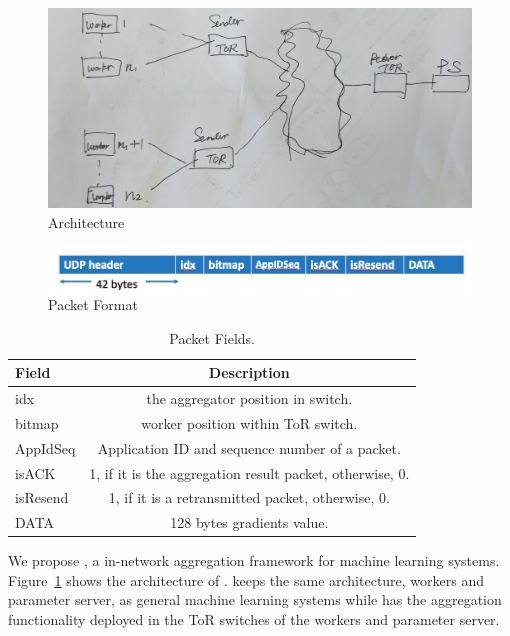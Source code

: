 \begin{figure}[htb]
    \centering
    \includegraphics[width=1.0\linewidth]{figures/p4ml-arch.jpg}
    \caption{\system Architecture}
    \label{fig:p4ml-arch}
\end{figure}
\begin{figure}
    \centering
    \includegraphics[width=1.0\linewidth]{figures/pktformat.jpeg}
    \caption{\system Packet Format}
    \label{fig:packet-format}
\end{figure}
\begin{table}[h!]
  \begin{center}
    \caption{Packet Fields.}
    \label{tab:packet-field}
    \begin{tabular}{|l|c|} 
	\hline
		\textbf{Field} & \textbf{Description} \\
      \hline
      idx & the aggregator position in switch.\\
      \hline
		bitmap & worker position within ToR switch. \\
      \hline
		AppIdSeq & Application ID and sequence number of a packet.\\
	  \hline
		isACK & 1, if it is the aggregation result packet, otherwise, 0. \\
		\hline
		isResend & 1, if it is a retransmitted packet, otherwise, 0. \\
		\hline 
		DATA &  128 bytes gradients value. \\
		\hline 
    \end{tabular}
  \end{center}
\end{table}
We propose \system, a in-network aggregation framework for machine learning systems.
Figure~\ref{fig:p4ml-arch} shows the architecture of \system. 
\system keeps the same architecture, workers and parameter server, as general machine learning systems
while has the aggregation functionality deployed in the ToR switches of the workers and parameter server.

